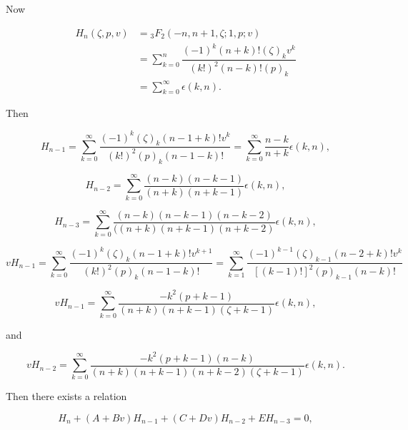 \begin{solution}
Now

$$\begin{array}{ll}
H_n(\zeta,p,v) &= {}_3F_2 (-n,n+1,\zeta;1,p;v) \\
&= \displaystyle\sum_{k=0}^n \dfrac{(-1)^k (n+k)! (\zeta)_k v^k}{(k!)^2(n-k)! (p)_k} \\
&= \displaystyle\sum_{k=0}^{\infty} \epsilon(k,n).
\end{array}$$

Then

$$H_{n-1} = \displaystyle\sum_{k=0}^{\infty} \dfrac{(-1)^k (\zeta)_k (n-1+k)! v^k}{(k!)^2 (p)_k (n-1-k)!} = \displaystyle\sum_{k=0}^{\infty} \dfrac{n-k}{n+k} \epsilon(k,n),$$

$$H_{n-2} = \displaystyle\sum_{k=0}^{\infty} \dfrac{(n-k)(n-k-1)}{(n+k)(n+k-1)} \epsilon(k,n),$$

$$H_{n-3} = \displaystyle\sum_{k=0}^{\infty} \dfrac{(n-k)(n-k-1)(n-k-2)}{((n+k) (n+k-1)(n+k-2)} \epsilon(k,n),$$

$$vH_{n-1} = \displaystyle\sum_{k=0}^{\infty} \dfrac{(-1)^k (\zeta)_k (n-1+k)! v^{k+1}}{(k!)^2(p)_k (n-1-k)!} = \displaystyle\sum_{k=1}^{\infty} \dfrac{(-1)^{k-1} (\zeta)_{k-1} (n-2+k)! v^k}{[(k-1)!]^2(p)_{k-1}(n-k)!}$$

$$vH_{n-1} = \displaystyle\sum_{k=0}^{\infty} \dfrac{-k^2(p+k-1)}{(n+k)(n+k-1)(\zeta+k-1)} \epsilon(k,n),$$

and

$$vH_{n-2} = \displaystyle\sum_{k=0}^{\infty} \dfrac{-k^2(p+k-1)(n-k)}{(n+k)(n+k-1)(n+k-2)(\zeta+k-1)} \epsilon(k,n).$$

Then there exists a relation

$$H_n + (A+Bv)H_{n-1} + (C+Dv)H_{n-2} + EH_{n-3} =0,$$


\end{solution}
